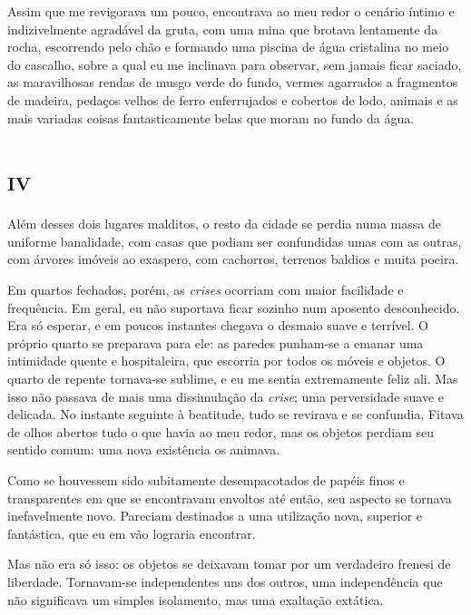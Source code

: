Assim que me revigorava um pouco, encontrava ao meu redor o cenário íntimo e indizivelmente agradável da gruta, com uma mina que brotava lentamente da rocha, escorrendo pelo chão e formando uma piscina de água cristalina no meio do cascalho, sobre a qual eu me inclinava para observar, sem jamais ficar saciado, as maravilhosas rendas de musgo verde do fundo, vermes agarrados a fragmentos de madeira, pedaços velhos de ferro enferrujados e cobertos de lodo, animais e as mais variadas coisas fantasticamente belas que moram no fundo da água.


\chapter*{\huge\centering\textsc{iv}}

Além desses dois lugares malditos, o resto da cidade se perdia numa massa de uniforme banalidade, com casas que podiam ser confundidas umas com as outras, com árvores imóveis ao exaspero, com cachorros, terrenos baldios e muita poeira.

Em quartos fechados, porém, as \textit{crises} ocorriam com maior facilidade e frequência. Em geral, eu não suportava ficar sozinho num aposento desconhecido. Era só esperar, e em poucos instantes chegava o desmaio suave e terrível. O próprio quarto se preparava para ele: as paredes punham-se a emanar uma intimidade quente e hospitaleira, que escorria por todos os móveis e objetos. O quarto de repente tornava-se sublime, e eu me sentia extremamente feliz ali. Mas isso não passava de mais uma dissimulação da \textit{crise}; uma perversidade suave e delicada. No instante seguinte à beatitude, tudo se revirava e se confundia. Fitava de olhos abertos tudo o que havia ao meu redor, mas os objetos perdiam seu sentido comum: uma nova existência os animava.

Como se houvessem sido subitamente desempacotados de papéis finos e transparentes em que se encontravam envoltos até então, seu aspecto se tornava inefavelmente novo. Pareciam destinados a uma utilização nova, superior e fantástica, que eu em vão lograria encontrar.

Mas não era só isso: os objetos se deixavam tomar por um verdadeiro frenesi de liberdade. Tornavam-se independentes uns dos outros, uma independência que não significava um simples isolamento, mas uma exaltação extática.


